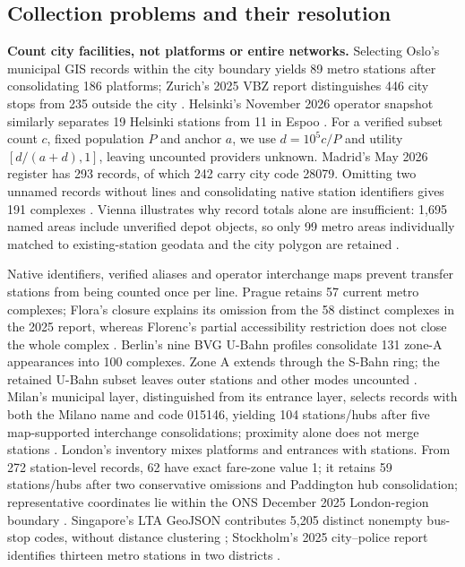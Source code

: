 \subsection{Collection problems and their resolution}
\textbf{Count city facilities, not platforms or entire networks.}
Selecting Oslo's municipal GIS records within the city boundary yields 89
metro stations after consolidating 186
platforms; Zurich's 2025 VBZ report distinguishes 446 city stops from 235
outside the city \cite{oslo,vbz}. Helsinki's November 2026 operator snapshot
similarly separates 19 Helsinki stations from 11 in Espoo \cite{helsinki}.
For a verified subset count $c$, fixed population $P$ and anchor $a$, we use
$d=10^5c/P$ and utility $[d/(a+d),1]$, leaving uncounted providers unknown.
Madrid's May 2026 register has 293 records, of which 242 carry city code
28079. Omitting two unnamed records without lines and consolidating native
station identifiers gives 191 complexes \cite{madridmetro,inecodes}. Vienna illustrates why record totals
alone are insufficient: 1,695 named areas include unverified depot objects,
so only 99 metro areas individually matched to existing-station geodata and
the city polygon are retained \cite{viennaogd,viennagis}.

Native identifiers, verified aliases and operator interchange maps prevent
transfer stations from being counted once per line. Prague retains 57 current
metro complexes; Flora's closure explains its omission from the 58 distinct
complexes in the 2025 report, whereas Florenc's partial accessibility restriction
does not close the whole complex \cite{pidmetro,dpp2025,floraclose}.
Berlin's nine BVG U-Bahn profiles consolidate 131 zone-A appearances into 100
complexes. Zone A extends through the S-Bahn ring; the retained U-Bahn subset
leaves outer stations and other modes uncounted
\cite{bvg}. Milan's municipal layer, distinguished from its entrance layer,
selects records with both the Milano name and code 015146, yielding 104
stations/hubs after five map-supported interchange consolidations;
proximity alone does not merge stations \cite{milanmetro}.
London's inventory mixes platforms and entrances with stations. From 272
station-level records, 62 have exact fare-zone value 1; it retains 59
stations/hubs after two conservative omissions and
Paddington hub consolidation; representative coordinates lie within the ONS
December 2025 London-region boundary \cite{tflinventory,onslondon}.
Singapore's LTA GeoJSON contributes 5,205 distinct nonempty bus-stop codes,
without distance clustering \cite{sgbus_lta}; Stockholm's 2025 city--police
report identifies thirteen metro stations in two districts \cite{stockholmmetro2025}.

